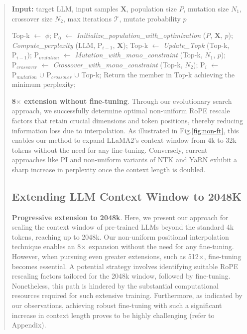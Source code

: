 \begin{abstract}
\begin{algorithm}[t]
	\small
	\caption{The search algorithm}
	\textbf{Input:} target LLM, input samples $\mathbf{X}$,   population size $P$, mutation size $N_1$, crossover size $N_2$, max iterations $\mathcal{T}$, mutate probability $p$\\

	\begin{algorithmic}[1]
		\label{alg:search}
		\STATE Top-k $\gets$ $\phi$;	
		\STATE $\text{P}_0$ $\gets$ \textit{Initialize\_population\_with\_optimization} ($P$, $\mathbf{X}$, $p$); 
		\STATE \textit{Compute\_perplexity} (LLM, $\text{P}_{i-1}$, $\mathbf{X}$);
		\STATE  Top-k $\gets$ \textit{Update\_Topk} (Top-k, $\text{P}_{i-1}$);
		\STATE $\text{P}_{mutation}$ $\gets$ \textit{Mutation\_with\_mono\_constraint} (Top-k, $N_1$, $p$); 
		\STATE $\text{P}_{crossover}$ $\gets$ \textit{Crossover\_with\_mono\_constraint} (Top-k, $N_2$);
		\STATE $\text{P}_i$ $\gets$ $\text{P}_{mutation}$ $\cup$ $\text{P}_{crossover}$ $\cup$ Top-k;
		\ENDFOR
		\STATE Return the member in Top-k achieving the minimum perplexity;
	\end{algorithmic}
\end{algorithm}

\textbf{8$\times$ extension without fine-tuning}. Through our evolutionary search approach, we successfully determine optimal non-uniform RoPE rescale factors that retain crucial dimensions and token positions, thereby reducing information loss due to interpolation. As illustrated in Fig.\ref{fig:non-ft}, this enables our method to expand LLaMA2’s context window from 4k to 32k tokens without the need for any fine-tuning. Conversely, current approaches like PI and non-uniform variants of NTK and YaRN exhibit a sharp increase in perplexity once the context length is doubled.

\subsection{Extending LLM Context Window to 2048K}
\label{sec:extendto2048k}

\textbf{Progressive extension to 2048k}. Here, we present our approach for scaling the context window of pre-trained LLMs beyond the standard 4k tokens, reaching up to 2048k. Our non-uniform positional interpolation technique enables an 8$\times$ expansion without the need for any fine-tuning. However, when pursuing even greater extensions, such as 512$\times$, fine-tuning becomes essential. A potential strategy involves identifying suitable RoPE rescaling factors tailored for the 2048k window, followed by fine-tuning. Nonetheless, this path is hindered by the substantial computational resources required for such extensive training. Furthermore, as indicated by our observations, achieving robust fine-tuning with such a significant increase in context length proves to be highly challenging (refer to Appendix).


\end{abstract}

